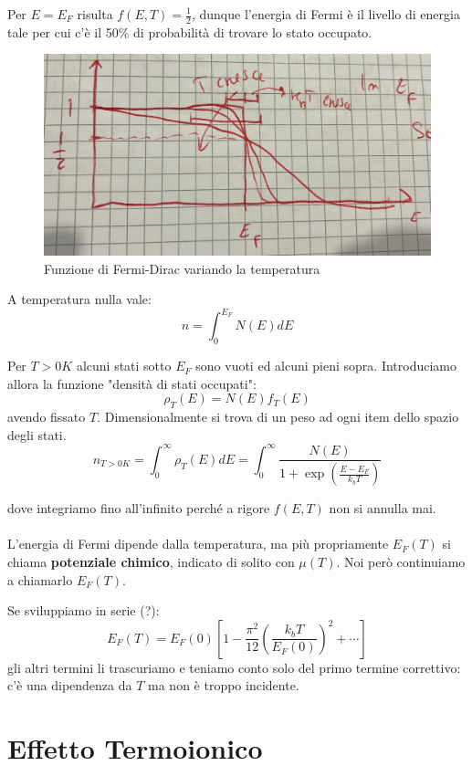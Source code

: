 \documentclass{book}
\begin{document}
            Per $E=E_{F}$ risulta $f(E,T) = \frac{1}{2}$, dunque l'energia di Fermi è il livello di energia tale per cui c'è il 50\% di probabilità di trovare lo stato occupato.
            \begin{figure}[h!]
                \centering
                \includegraphics[width=0.5\linewidth]{img/RobettaFermiLez12.png}
                \caption{Funzione di Fermi-Dirac variando la temperatura}
            \end{figure}

            A temperatura nulla vale:
            $$n = \int_{0} ^{E_{F}} N(E)dE$$

            Per $T>0K$ alcuni stati sotto $E_{F}$ sono vuoti ed alcuni pieni sopra. Introduciamo allora la funzione "densità di stati occupati":
            $$\rho_{T}(E) = N(E)f_{T}(E)$$
            avendo fissato $T$. Dimensionalmente si trova di un peso ad ogni item dello spazio degli stati.
            $$n_{T>0K} = \int_{0} ^{\infty} \rho_{T} (E) dE = \int_{0} ^{\infty} \frac{N(E)}{1+\exp{(\frac{E-E_{F}}{k_{b}T})}}$$

            dove integriamo fino all'infinito perché a rigore $f(E,T)$ non si annulla mai.

        \paragraph{}
            L'energia di Fermi dipende dalla temperatura, ma più propriamente $E_{F}(T)$ si chiama \textbf{potenziale chimico}, indicato di solito con $\mu (T)$. Noi però continuiamo a chiamarlo $E_{F}(T)$.

            Se sviluppiamo in serie (?):
            $$E_{F}(T) = E_{F}(0)[1 - \frac{\pi ^{2}}{12}(\frac{k_{b}T}{E_{F}(0)})^{2}+ \cdots ]$$
            gli altri termini li trascuriamo e teniamo conto solo del primo termine correttivo: c'è una dipendenza da $T$ ma non è troppo incidente.


      \section{Effetto Termoionico}
\end{document}
